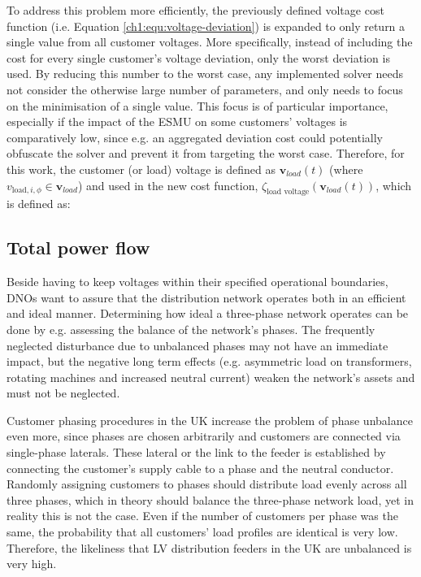 To address this problem more efficiently, the previously defined voltage cost function (i.e. Equation \ref{ch1:equ:voltage-deviation}) is expanded to only return a single value from all customer voltages.
More specifically, instead of including the cost for every single customer's voltage deviation, only the worst deviation is used.
By reducing this number to the worst case, any implemented solver needs not consider the otherwise large number of parameters, and only needs to focus on the minimisation of a single value.
This focus is of particular importance, especially if the impact of the ESMU on some customers' voltages is comparatively low, since e.g. an aggregated deviation cost could potentially obfuscate the solver and prevent it from targeting the worst case.
Therefore, for this work, the customer (or load) voltage is defined as $\textbf{v}_{load}(t)$ (where $v_{\text{load},i,\phi} \in \textbf{v}_{load}$) and used in the new cost function, $\zeta_\text{load voltage}(\textbf{v}_{load}(t))$, which is defined as:



\subsection{Total power flow}
\label{ch1:subsec:total-power-flow}

Beside having to keep voltages within their specified operational boundaries, DNOs want to assure that the distribution network operates both in an efficient and ideal manner.
Determining how ideal a three-phase network operates can be done by e.g. assessing the balance of the network's phases.
The frequently neglected disturbance due to unbalanced phases may not have an immediate impact, but the negative long term effects (e.g. asymmetric load on transformers, rotating machines and increased neutral current) weaken the network's assets and must not be neglected.

Customer phasing procedures in the UK increase the problem of phase unbalance even more, since phases are chosen arbitrarily and customers are connected via single-phase laterals.
These lateral or the link to the feeder is established by connecting the customer's supply cable to a phase and the neutral conductor.
Randomly assigning customers to phases should distribute load evenly across all three phases, which in theory should balance the three-phase network load, yet in reality this is not the case.
Even if the number of customers per phase was the same, the probability that all customers' load profiles are identical is very low.
Therefore, the likeliness that LV distribution feeders in the UK are unbalanced is very high.


